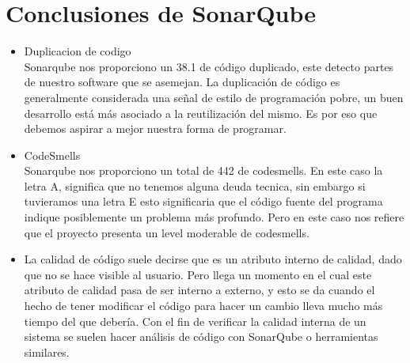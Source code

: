 \documentclass[preprint,12pt]{elsarticle}
\begin{document}
\section{Conclusiones de SonarQube }

\begin{itemize}
	
	\item Duplicacion de codigo \\
	Sonarqube nos proporciono un 38.1 de código duplicado, este detecto partes de nuestro software que se asemejan. La duplicación de código es generalmente considerada una señal de estilo de programación pobre, un buen desarrollo está más asociado a la reutilización del mismo. Es por eso que debemos aspirar a mejor nuestra forma de programar.
	
	\item CodeSmells  	\\
	Sonarqube nos proporciono un total de 442 de codesmells. En este caso la letra A, significa que no tenemos alguna deuda tecnica, sin embargo si tuvieramos una letra E esto significaria que el código fuente del programa  indique posiblemente un problema más profundo. Pero en este caso nos refiere que el proyecto presenta un level moderable de codesmells.
	
	\item La calidad de código suele decirse que es un atributo interno de calidad, dado que no se hace visible al usuario. Pero llega un momento en el cual este atributo de calidad pasa de ser interno a externo, y esto se da cuando el hecho de tener modificar el código para hacer un cambio lleva mucho más tiempo del que debería. Con el fin de verificar la calidad interna de un sistema se suelen hacer análisis de código con SonarQube o herramientas similares. 
	
\end{itemize}

\end{document}
